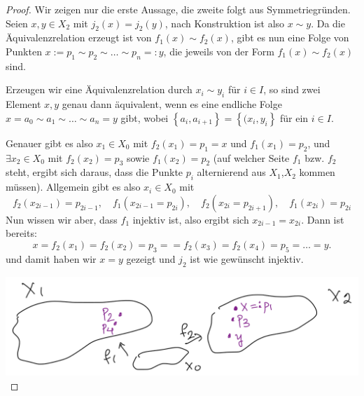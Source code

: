 \begin{proof}
    Wir zeigen nur die erste Aussage, die zweite folgt aus Symmetriegründen. Seien $x,y \in X_2$ mit $j_2(x) = j_2(y)$, nach Konstruktion ist also $x \sim y$. Da die Äquivalenzrelation erzeugt ist von $f_1(x) \sim f_2(x)$, gibt es nun eine Folge von Punkten $x := p_1 \sim  p_2 \sim  \ldots \sim  p_n =: y$, die jeweils von der Form $f_1(x) \sim  f_2(x)$ sind.
    \begin{recap}
        Erzeugen wir eine Äquivalenzrelation durch $x_i \sim  y_i$ für $i\in I$, so sind zwei Element $x,y$ genau dann äquivalent, wenn es eine endliche Folge  $x = a_0 \sim  a_1 \sim  \ldots \sim a_n = y$ gibt, wobei $\left \{a_i, a_{i+1}\right\}  = \left \{(x_i, y_i\right\} $   für ein $i\in I$. 
    \end{recap}
    Genauer gibt es also $x_1\in X_0$ mit $f_2(x_1 ) = p_1 = x$ und $f_1(x_1) = p_2$, und $\exists x_2\in X_0$ mit $f_2(x_2) = p_3$ sowie $f_1(x_2) = p_2$ (auf welcher Seite $f_1$ bzw. $f_2$ steht, ergibt sich daraus, dass die Punkte $p_i$ alternierend aus  $X_1$,$X_2$ kommen müssen). Allgemein gibt es also $x_i \in X_0$ mit 
    \[
        f_2(x_{2i-1}) = p_{2i-1},\quad f_1(x_{2i-1} = p_{2i}),\quad  f_2(x_{2i} = p_{2i+1}),\quad f_1(x_{2i}) = p_{2i} 
    \]
    Nun wissen wir aber, dass $f_1$ injektiv ist, also ergibt sich $x_{2i-1} = x_{2i}$. Dann ist bereits:
    \[
        x = f_2(x_1) = f_2(x_2) = p_3 = = f_2(x_3) = f_2(x_4) = p_5 = \ldots = y
    .\] 
    und damit haben wir $x=y$ gezeigt und  $j_2$ ist wie gewünscht injektiv.

    \begin{minipage}{\textwidth}
        \centering
        \includegraphics[scale=0.25]{figures/handdrawn/beweisskizze-lemma-8.6.png}
    \end{minipage}
\end{proof}

